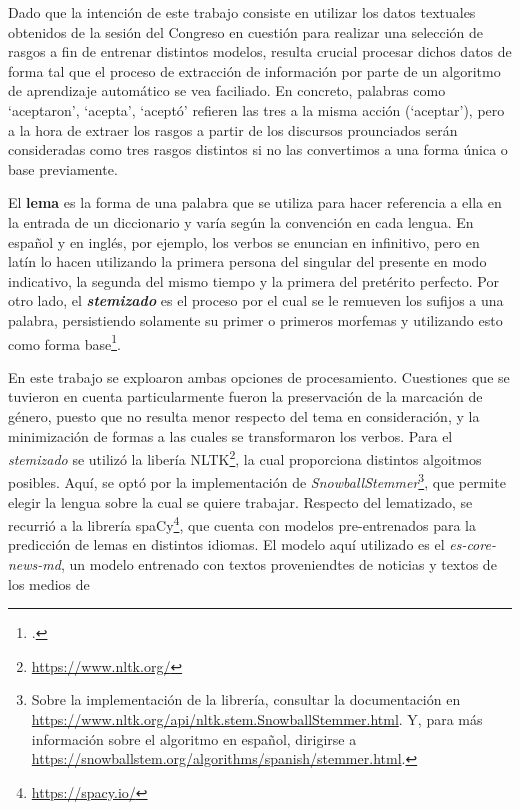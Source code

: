 Dado que la intención de este trabajo consiste en utilizar los datos textuales
obtenidos de la sesión del Congreso en cuestión para realizar una selección
de rasgos a fin de entrenar distintos modelos, resulta crucial procesar dichos
datos de forma tal que el proceso de extracción de información por parte
de un algoritmo de aprendizaje automático se vea faciliado. En concreto, palabras
como `aceptaron', `acepta', `aceptó' refieren las tres a la misma acción (`aceptar'),
pero a la hora de extraer los rasgos a partir de los discursos prounciados serán
consideradas como tres rasgos distintos si no las convertimos a una forma única o
base previamente.
\par
El \textbf{lema} es la forma de una palabra que se utiliza para hacer referencia a ella
en la entrada de un diccionario y varía según la convención en cada lengua. En español
y en inglés, por ejemplo, los verbos se enuncian en infinitivo, pero en latín lo hacen
utilizando la primera persona del singular del presente en modo indicativo, la segunda
del mismo tiempo y la primera del pretérito perfecto. Por otro lado, el
\textbf{\textit{stemizado}} es el proceso por el cual se le remueven los sufijos
a una palabra, persistiendo solamente su primer o primeros morfemas y utilizando
esto como forma base\footnote{\citet[Capítulo~3]{bird2009natural}.}.
\par
En este trabajo se exploaron ambas opciones de procesamiento. Cuestiones que se tuvieron
en cuenta particularmente fueron la preservación de la marcación de género, puesto que
no resulta menor respecto del tema en consideración, y la minimización de formas a las
cuales se transformaron los verbos. Para el \textit{stemizado} se utilizó la
libería NLTK\footnote{\url{https://www.nltk.org/}}, la cual proporciona distintos algoitmos posibles. Aquí, se optó por la
implementación de \textit{SnowballStemmer}\footnote{Sobre la implementación de la
librería, consultar la documentación en
\url{https://www.nltk.org/api/nltk.stem.SnowballStemmer.html}. Y, para más información
sobre el algoritmo en español, dirigirse a
\url{https://snowballstem.org/algorithms/spanish/stemmer.html}.}, que permite elegir
la lengua sobre la cual se quiere trabajar. Respecto del lematizado, se recurrió
a la librería spaCy\footnote{\url{https://spacy.io/}}, que cuenta con modelos
pre-entrenados para la predicción de lemas en distintos idiomas. El modelo aquí
utilizado es el \textit{es-core-news-md}, un modelo entrenado con textos
proveniendtes de noticias y textos de los medios de
